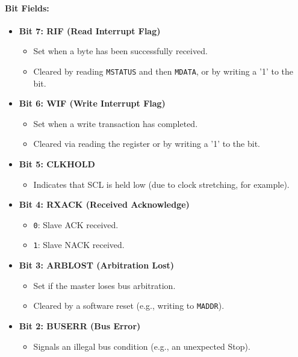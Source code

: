 \paragraph{Bit Fields:}
\begin{itemize}[leftmargin=*,itemsep=2mm]
  \item \textbf{Bit 7: RIF (Read Interrupt Flag)}  
        \begin{itemize}
          \item Set when a byte has been successfully received.
          \item Cleared by reading \texttt{MSTATUS} and then \texttt{MDATA}, or by writing a '1' to the bit.
        \end{itemize}
  \item \textbf{Bit 6: WIF (Write Interrupt Flag)}  
        \begin{itemize}
          \item Set when a write transaction has completed.
          \item Cleared via reading the register or by writing a '1' to the bit.
        \end{itemize}
  \item \textbf{Bit 5: CLKHOLD}  
        \begin{itemize}
          \item Indicates that SCL is held low (due to clock stretching, for example).
        \end{itemize}
  \item \textbf{Bit 4: RXACK (Received Acknowledge)}  
        \begin{itemize}
          \item \texttt{0}: Slave ACK received.
          \item \texttt{1}: Slave NACK received.
        \end{itemize}
  \item \textbf{Bit 3: ARBLOST (Arbitration Lost)}  
        \begin{itemize}
          \item Set if the master loses bus arbitration.
          \item Cleared by a software reset (e.g., writing to \texttt{MADDR}).
        \end{itemize}
  \item \textbf{Bit 2: BUSERR (Bus Error)}  
        \begin{itemize}
          \item Signals an illegal bus condition (e.g., an unexpected Stop).

\end{itemize}
\end{itemize}
